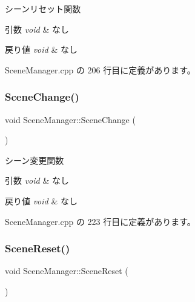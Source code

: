 シーンリセット関数 


\begin{DoxyParams}{引数}
{\em void} & なし \\
\hline
\end{DoxyParams}

\begin{DoxyRetVals}{戻り値}
{\em void} & なし \\
\hline
\end{DoxyRetVals}


 Scene\+Manager.\+cpp の 206 行目に定義があります。

\mbox{\label{class_scene_manager_ab1ffc5d84cf812e4105cba755d034770}} 
\subsubsection{\texorpdfstring{Scene\+Change()}{SceneChange()}}
{\footnotesize\ttfamily void Scene\+Manager\+::\+Scene\+Change (\begin{DoxyParamCaption}{ }\end{DoxyParamCaption})\hspace{0.3cm}{\ttfamily [private]}}



シーン変更関数 


\begin{DoxyParams}{引数}
{\em void} & なし \\
\hline
\end{DoxyParams}

\begin{DoxyRetVals}{戻り値}
{\em void} & なし \\
\hline
\end{DoxyRetVals}


 Scene\+Manager.\+cpp の 223 行目に定義があります。

\mbox{\label{class_scene_manager_a0652a81c7baff52add9ec4b13205865c}} 
\subsubsection{\texorpdfstring{Scene\+Reset()}{SceneReset()}}
{\footnotesize\ttfamily void Scene\+Manager\+::\+Scene\+Reset (\begin{DoxyParamCaption}{ }\end{DoxyParamCaption})\hspace{0.3cm}{\ttfamily [private]}}




